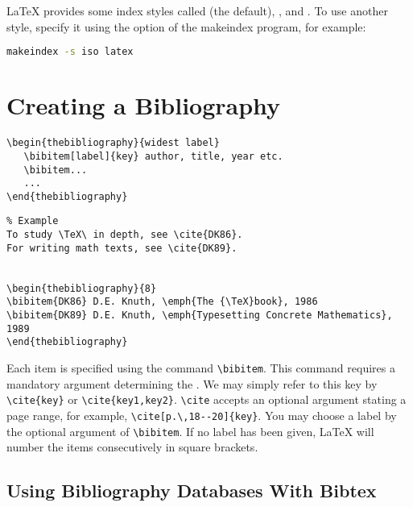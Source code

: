 LaTeX provides some index styles called  (the default), , and .
To use another style, specify it using the  option of the makeindex program, for example:
\begin{lstlisting}[language=sh]
makeindex -s iso latex
\end{lstlisting}


\section{Creating a Bibliography}
\label{sec:creat-bibl}

\begin{lstlisting}
\begin{thebibliography}{widest label}
   \bibitem[label]{key} author, title, year etc.
   \bibitem...
   ...
\end{thebibliography}
\end{lstlisting}


\begin{lstlisting}
% Example
To study \TeX\ in depth, see \cite{DK86}. 
For writing math texts, see \cite{DK89}.


\begin{thebibliography}{8}
\bibitem{DK86} D.E. Knuth, \emph{The {\TeX}book}, 1986
\bibitem{DK89} D.E. Knuth, \emph{Typesetting Concrete Mathematics}, 1989
\end{thebibliography}
\end{lstlisting}

Each item is specified using the command \lstinline|\bibitem|.
This command requires a mandatory argument determining the .
We may simply refer to this key by \lstinline|\cite{key}| or \lstinline|\cite{key1,key2}|.
\lstinline|\cite| accepts an optional argument stating a page range, for example, \lstinline|\cite[p.\,18--20]{key}|.
You may choose a label by the optional argument of \lstinline|\bibitem|.
If no label has been given, LaTeX will number the items consecutively in square brackets.


\subsection[Bibtex]{Using Bibliography Databases With Bibtex}
\label{sec:using-bibl-datab}


